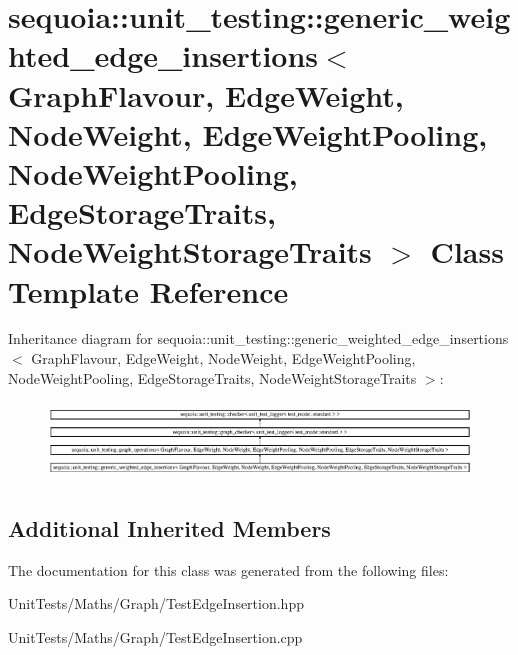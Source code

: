 \hypertarget{classsequoia_1_1unit__testing_1_1generic__weighted__edge__insertions}{}\section{sequoia\+::unit\+\_\+testing\+::generic\+\_\+weighted\+\_\+edge\+\_\+insertions$<$ Graph\+Flavour, Edge\+Weight, Node\+Weight, Edge\+Weight\+Pooling, Node\+Weight\+Pooling, Edge\+Storage\+Traits, Node\+Weight\+Storage\+Traits $>$ Class Template Reference}
\label{classsequoia_1_1unit__testing_1_1generic__weighted__edge__insertions}
Inheritance diagram for sequoia\+::unit\+\_\+testing\+::generic\+\_\+weighted\+\_\+edge\+\_\+insertions$<$ Graph\+Flavour, Edge\+Weight, Node\+Weight, Edge\+Weight\+Pooling, Node\+Weight\+Pooling, Edge\+Storage\+Traits, Node\+Weight\+Storage\+Traits $>$\+:\begin{figure}[H]
\begin{center}
\leavevmode
\includegraphics[height=2.051282cm]{classsequoia_1_1unit__testing_1_1generic__weighted__edge__insertions}
\end{center}
\end{figure}
\subsection*{Additional Inherited Members}


The documentation for this class was generated from the following files\+:\begin{DoxyCompactItemize}
\item 
Unit\+Tests/\+Maths/\+Graph/Test\+Edge\+Insertion.\+hpp\item 
Unit\+Tests/\+Maths/\+Graph/Test\+Edge\+Insertion.\+cpp\end{DoxyCompactItemize}
